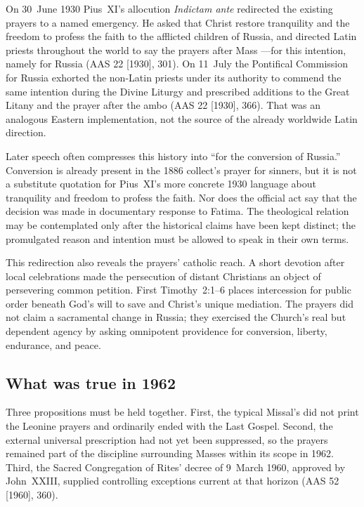 On 30~June 1930 Pius~XI's allocution \emph{Indictam ante} redirected the existing prayers to a named emergency. He asked that Christ restore tranquility and the freedom to profess the faith to the afflicted children of Russia, and directed Latin priests throughout the world to say the prayers after Mass ---for this intention, namely for Russia (AAS 22 [1930], 301). On 11~July the Pontifical Commission for Russia exhorted the non-Latin priests under its authority to commend the same intention during the Divine Liturgy and prescribed additions to the Great Litany and the prayer after the ambo (AAS 22 [1930], 366). That was an analogous Eastern implementation, not the source of the already worldwide Latin direction.

Later speech often compresses this history into “for the conversion of Russia.” Conversion is already present in the 1886 collect's prayer for sinners, but it is not a substitute quotation for Pius~XI's more concrete 1930 language about tranquility and freedom to profess the faith. Nor does the official act say that the decision was made in documentary response to Fatima. The theological relation may be contemplated only after the historical claims have been kept distinct; the promulgated reason and intention must be allowed to speak in their own terms.

This redirection also reveals the prayers' catholic reach. A short devotion after local celebrations made the persecution of distant Christians an object of persevering common petition. First Timothy~2:1--6 places intercession for public order beneath God's will to save and Christ's unique mediation. The prayers did not claim a sacramental change in Russia; they exercised the Church's real but dependent agency by asking omnipotent providence for conversion, liberty, endurance, and peace.

\subsection*{What was true in 1962}

Three propositions must be held together. First, the typical Missal's  did not print the Leonine prayers and ordinarily ended with the Last Gospel. Second, the external universal prescription had not yet been suppressed, so the prayers remained part of the discipline surrounding Masses within its scope in 1962. Third, the Sacred Congregation of Rites' decree of 9~March 1960, approved by John~XXIII, supplied controlling exceptions current at that horizon (AAS 52 [1960], 360).

